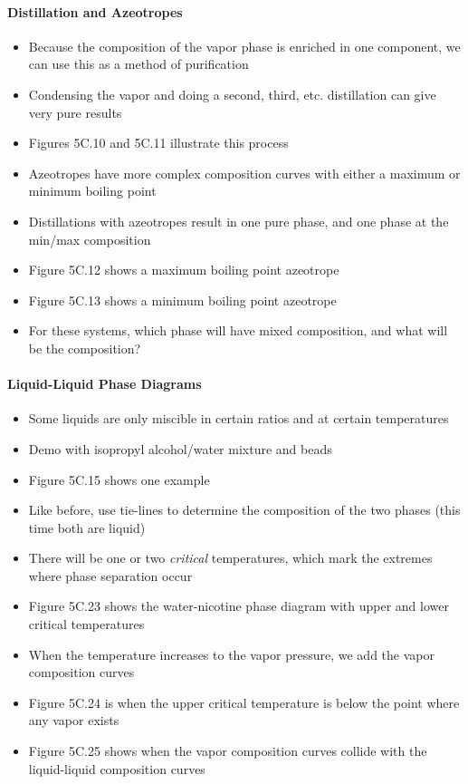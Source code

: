 \documentclass[12pt, openany, letterpaper]{memoir}
\begin{document}
\paragraph{Distillation and Azeotropes}
\begin{itemize}
	\item Because the composition of the vapor phase is enriched in one component, we can use this as a method of purification
	\item Condensing the vapor and doing a second, third, etc. distillation can give very pure results
	\item Figures 5C.10 and 5C.11 illustrate this process
	\item Azeotropes have more complex composition curves with either a maximum or minimum boiling point
	\item Distillations with azeotropes result in one pure phase, and one phase at the min/max composition
	\item Figure 5C.12 shows a maximum boiling point azeotrope
	\item Figure 5C.13 shows a minimum boiling point azeotrope
	\item For these systems, which phase will have mixed composition, and what will be the composition?
\end{itemize}
\paragraph{Liquid-Liquid Phase Diagrams}
\begin{itemize}
	\item Some liquids are only miscible in certain ratios and at certain temperatures
	\item Demo with isopropyl alcohol/water mixture and beads
	\item Figure 5C.15 shows one example
	\item Like before, use tie-lines to determine the composition of the two phases (this time both are liquid)
	\item There will be one or two \emph{critical} temperatures, which mark the extremes where phase separation occur
	\item Figure 5C.23 shows the water-nicotine phase diagram with upper and lower critical temperatures
	\item When the temperature increases to the vapor pressure, we add the vapor composition curves
	\item Figure 5C.24 is when the upper critical temperature is below the point where any vapor exists	
	\item Figure 5C.25 shows when the vapor composition curves collide with the liquid-liquid composition curves
\end{itemize}
\end{document}

